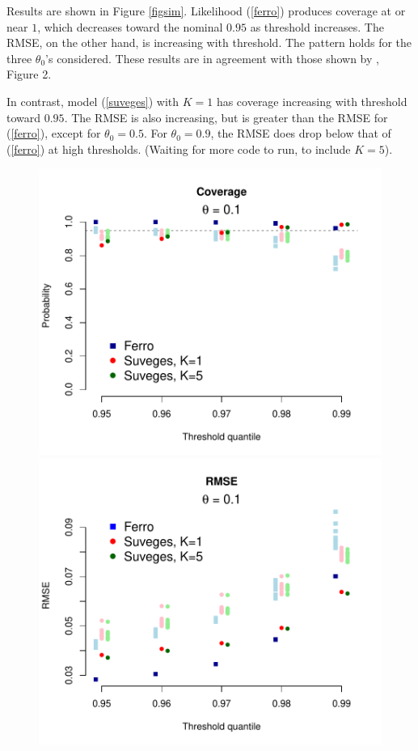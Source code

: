 Results are shown in Figure \ref{figsim}. Likelihood (\ref{ferro}) produces coverage at or near $1$, which decreases toward the nominal $0.95$ as threshold increases. The RMSE, on the other hand, is increasing with threshold. The pattern holds for the three $\theta_0$'s considered. These results are in agreement with those shown by \cite{ferro2003inference}, Figure 2.

In contrast, model (\ref{suveges}) with $K=1$ has coverage increasing with threshold toward $0.95$. The RMSE is also increasing, but is greater than the RMSE for (\ref{ferro}), except for $\theta_0=0.5$. For $\theta_0=0.9$, the RMSE does drop below that of (\ref{ferro}) at high thresholds. (Waiting for more code to run, to include $K=5$).


\begin{figure}[H]
\begin{center}
\includegraphics[scale=0.48]{../extremal_comparison/figs/sim_coverage_10.pdf}
\includegraphics[scale=0.48]{../extremal_comparison/figs/sim_rmse_10.pdf}

\end{center}
\end{figure}

